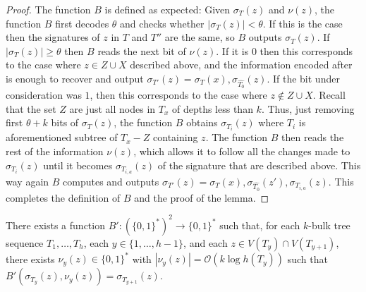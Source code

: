 \documentclass[kpfonts]{patmorin}
\newcommand{\snote}[1]{\fcolorbox{red}{yellow}{#1}}
\newcommand{\Oh}{\mathcal{O}}
\let\geq\geqslant
\begin{document}
\begin{proof}
  The function $B$ is defined as expected:
  Given $\sigma_{T}(z)$ and $\nu(z)$, the function $B$ first decodes $\theta$ and checks whether $|\sigma_{T}(z)| < \theta$. If this is the case then the signatures of $z$ in $T$ and $T''$ are the same, so $B$ outputs $\sigma_{T}(z)$.
  If $|\sigma_{T}(z)| \geq \theta$ then $B$ reads the next bit of $\nu(z)$. 
  If it is $0$ then this corresponds to the case where $z\in Z\cup X$ described above, and the information encoded after is enough to recover and output $\sigma_{T'}(z)=\sigma_{T}(x),\sigma_{\hat{T_0}}(z)$.
  If the bit under consideration was $1$, then this corresponds to the case where $z\not\in Z\cup X$. 
  Recall that the set $Z$ are just all nodes in $T_x$ of depths less than $k$. 
  Thus, just removing first $\theta+k$ bits of $\sigma_{T}(z)$, the function $B$ obtains $\sigma_{T_i}(z)$ where $T_i$ is aforementioned subtree of $T_x-Z$ containing $z$.
  The function $B$ then reads the rest of the information $\nu(z)$, 
  which allows it to follow all the changes made to $\sigma_{T_i}(z)$ until it becomes $\sigma_{T_{i,a}}(z)$ of the signature that are described above. 
  This way again $B$ computes and outputs $\sigma_{T'}(z) = \sigma_{T}(x),\sigma_{\hat{T_0}}(z'),\sigma_{T_{i,a}}(z)$.
  This completes the definition of $B$ and the proof of the lemma.
\end{proof}

\begin{lem}
  There exists a function $B':(\{0,1\}^*)^2\to\{0,1\}^*$ such that, for each $k$-bulk tree sequence $T_1,\ldots,T_h$, each $y\in\{1,\ldots,h-1\}$, and each $z\in V(T_y)\cap V(T_{y+1})$, there exists $\nu_y(z)\in\{0,1\}^*$ with $|\nu_y(z)| = \Oh(k\log h(T_y))$ such that $B'(\sigma_{T_y}(z), \nu_y(z)) = \sigma_{T_{y+1}}(z)$.
\end{lem}


\end{document}
